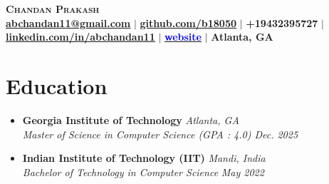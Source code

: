 \documentclass[A4,10pt]{article}
\begin{document}

\begin{center}
\textbf{\Huge \scshape Chandan Prakash} \\ \vspace{1pt}
\small 
{\href{mailto:sanchittanwar75@gmail.com}{{\textbf{\underline{abchandan11@gmail.com}}}}} $|$  
{\href{https://github.com/b18050}{{\textbf{\underline{github.com/b18050}}}}} $|$ 
{{\textbf{+19432395727}}} $|$ 
{\href{https://www.linkedin.com/in/abchandan11/}{{\textbf{\underline{linkedin.com/in/abchandan11}}}}} 
$|$ {\href{https://sites.gatech.edu/abchandan11/}{{\textbf{\underline{\textcolor{blue}{website}}}}}} 
$|$ {\textbf{Atlanta, GA}}
\end{center}



\vspace{-4.5mm}
\section{\textcolor{NavyBlue}{Education}}
  \begin{itemize}[leftmargin=0in, label={}]
    \item \textbf{Georgia Institute of Technology} \hfill  \textit{Atlanta, GA } \\
    \textit{Master of Science in Computer Science (GPA : 4.0)  \hfill \textit{Dec. 2025}}
    


    \item \textbf{Indian Institute of Technology (IIT) } \hfill \textit{ Mandi, India} \\
    \textit{Bachelor of Technology in Computer Science} \hfill \textit{ May 2022}
  \end{itemize}
\end{document}

